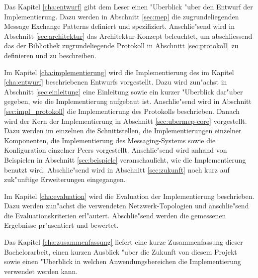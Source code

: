 Das Kapitel \ref{cha:entwurf} gibt dem Leser einen "Uberblick "uber den Entwurf der Implementierung. Dazu werden in Abschnitt \ref{sec:mep} die zugrundeliegenden Message Exchange Patterns definiert und spezifiziert. Anschlie"send wird in Abschnitt \ref{sec:architektur} das Architektur-Konzept beleuchtet, um abschliessend das der Bibliothek zugrundeliegende Protokoll in Abschnitt \ref{sec:protokoll} zu definieren und zu beschreiben.

Im Kapitel \ref{cha:implementierung} wird die Implementierung des im Kapitel \ref{cha:entwurf} beschriebenen Entwurfs vorgestellt. Dazu wird zun"achst in Abschnitt \ref{sec:einleitung} eine Einleitung sowie ein kurzer "Uberblick dar"uber gegeben, wie die Implementierung aufgebaut ist. Anschlie"send wird in Abschnitt \ref{sec:impl_protokoll} die Implementierung des Protokolls beschrieben. Danach wird der Kern der Implementierung in Abschnitt \ref{sec:ubermep-core} vorgestellt. Dazu werden im einzelnen die Schnittstellen, die Implementierungen einzelner Komponenten, die Implementierung des Messaging-Systems sowie die Konfiguration einzelner Peers vorgestellt. Anschlie"send wird anhand von Beispielen in Abschnitt \ref{sec:beispiele} veranschaulicht, wie die Implementierung benutzt wird. Abschlie"send wird in Abschnitt \ref{sec:zukunft} noch kurz auf zuk"unftige Erweiterungen eingegangen.

Im Kapitel \ref{cha:evaluation} wird die Evaluation der Implementierung beschrieben. Dazu werden zun"achst die verwendeten Netzwerk-Topologien und anschlie"send die Evaluationskriterien erl"autert. Abschlie"send werden die gemessenen Ergebnisse pr"a\-sen\-tiert und bewertet.

Das Kapitel \ref{cha:zusammenfassung} liefert eine kurze Zusammenfassung dieser Bachelorarbeit, einen kurzen Ausblick "uber die Zukunft von diesem Projekt sowie einen "Uberblick in welchen Anwendungsbereichen die Implementierung verwendet werden kann.